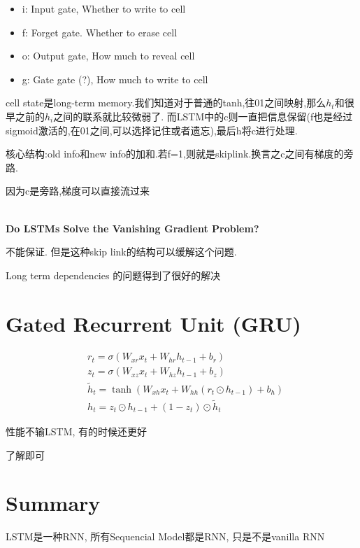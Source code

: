 	\begin{itemize}
		\item i: Input gate, Whether to write to cell
		\item f: Forget gate. Whether to erase cell
		\item o: Output gate, How much to reveal cell
		\item g: Gate gate (?), How much to write to cell
	\end{itemize}
	
	cell state是long-term memory.我们知道对于普通的tanh,往01之间映射,那么$h_t$和很早之前的$h_i$之间的联系就比较微弱了.
	而LSTM中的c则一直把信息保留(f也是经过sigmoid激活的,在01之间,可以选择记住或者遗忘),最后h将c进行处理.
	
	核心结构:old info和new info的加和.若f=1,则就是skiplink.换言之c之间有梯度的旁路.

	因为c是旁路,梯度可以直接流过来

	\textbf{\\Do LSTMs Solve the Vanishing Gradient Problem?}

	不能保证. 但是这种skip link的结构可以缓解这个问题.

	Long term dependencies 的问题得到了很好的解决

	\section{Gated Recurrent Unit (GRU)}

	\[
	\begin{aligned}
		&r_{t} =\sigma(W_{xr}x_t+W_{hr}h_{t-1}+b_r)  \\
		&z_{t} =\sigma(W_{xz}x_t+W_{hz}h_{t-1}+b_z)  \\
		&\tilde{h}_{t} =\tanh(W_{xh}x_t+W_{hh}(r_t\odot h_{t-1})+b_h)  \\
		&h_t =z_t\odot h_{t-1}+(1-z_t)\odot\tilde{h}_t 
	\end{aligned}	
	\]

	性能不输LSTM, 有的时候还更好

	了解即可

	\section{Summary}

	LSTM是一种RNN, 所有Sequencial Model都是RNN, 只是不是vanilla RNN